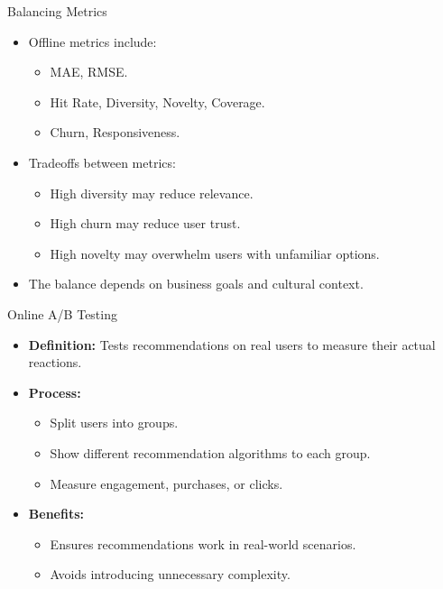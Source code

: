 \documentclass{beamer}
\begin{document}
\begin{frame}{Balancing Metrics}
\begin{itemize}
    \item Offline metrics include:
    \begin{itemize}
        \item MAE, RMSE.
        \item Hit Rate, Diversity, Novelty, Coverage.
        \item Churn, Responsiveness.
    \end{itemize}
    \item Tradeoffs between metrics:
    \begin{itemize}
        \item High diversity may reduce relevance.
        \item High churn may reduce user trust.
        \item High novelty may overwhelm users with unfamiliar options.
    \end{itemize}
    \item The balance depends on business goals and cultural context.
\end{itemize}
\end{frame}

\begin{frame}{Online A/B Testing}
\begin{itemize}
    \item \textbf{Definition:} Tests recommendations on real users to measure their actual reactions.
    \item \textbf{Process:}
    \begin{itemize}
        \item Split users into groups.
        \item Show different recommendation algorithms to each group.
        \item Measure engagement, purchases, or clicks.
    \end{itemize}
    \item \textbf{Benefits:}
    \begin{itemize}
        \item Ensures recommendations work in real-world scenarios.
        \item Avoids introducing unnecessary complexity.
    \end{itemize}
\end{itemize}
\end{frame}
\end{document}
